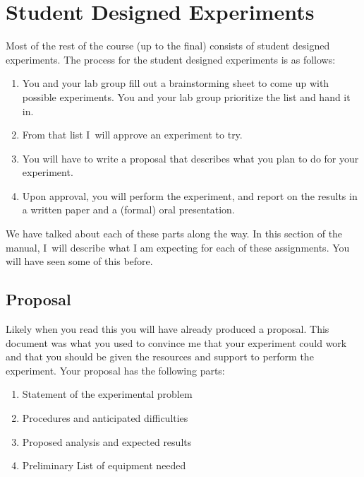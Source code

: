 \chapter{Student Designed Experiments\label{Student Designed Experiments}}
Most of the rest of the course (up to the final) consists of student designed experiments. The process for the student designed experiments is as follows:

\begin{enumerate}
\item You and your lab group fill out a brainstorming sheet to come up with possible experiments. You and your lab group prioritize the list and hand it in.

\item From that list I\ will approve an experiment to try.

\item You will have to write a proposal that describes what you plan to do
for your experiment.

\item Upon approval, you will perform the experiment, and report on the
results in a written paper and a (formal) oral presentation.
\end{enumerate}

We have talked about each of these parts along the way. In this section of
the manual, I\ will describe what I am expecting for each of these
assignments. You will have seen some of this before.

\section{Proposal}

Likely when you read this you will have already produced a proposal.  This document was what you used to convince me that your experiment could work and that you should be given the resources and support to perform the experiment. Your proposal has the following parts:

\begin{enumerate}
\item Statement of the experimental problem

\item Procedures and anticipated difficulties

\item Proposed analysis and expected results

\item Preliminary List of equipment needed
\end{enumerate}


